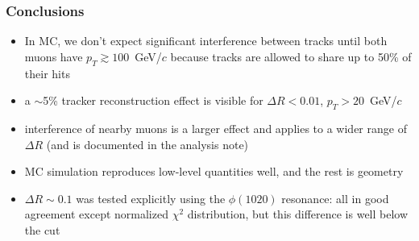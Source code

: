 \documentclass[compress]{beamer}
\begin{document}
\begin{frame}
\frametitle{Conclusions}

\begin{itemize}\setlength{\itemsep}{0.25 cm}
\item In MC, we don't expect significant interference between tracks
  until both muons have $p_T \gtrsim 100$~GeV/$c$ because tracks are
  allowed to share up to 50\% of their hits
\item a $\sim$5\% tracker reconstruction effect is visible for $\Delta R < 0.01$, $p_T > 20$~GeV/$c$
\item interference of nearby muons is a larger effect and applies to a wider range of $\Delta R$ (and is documented in the analysis note)
\item MC simulation reproduces low-level quantities well, and the rest is geometry
\item $\Delta R \sim 0.1$ was tested explicitly using the $\phi(1020)$
  resonance: all in good agreement except normalized $\chi^2$
  distribution, but this difference is well below the cut
\end{itemize}

\label{numpages}
\end{frame}
\end{document}
